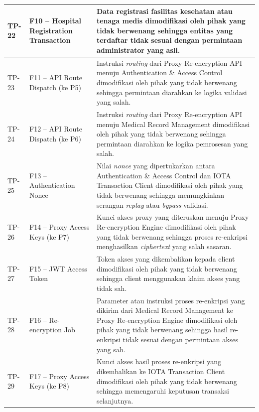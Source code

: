 \begin{xltabular}{\textwidth}{|>{\centering\arraybackslash}p{1.8cm}|>{\raggedright\arraybackslash}p{3.2cm}|X|}
    TP-22 &
    F10 -- Hospital Registration Transaction &
    Data registrasi fasilitas kesehatan atau tenaga medis dimodifikasi oleh pihak yang tidak berwenang sehingga entitas yang terdaftar tidak sesuai dengan permintaan administrator yang asli. \\
    \hline

    TP-23 &
    F11 -- API Route Dispatch (ke P5) &
    Instruksi \textit{routing} dari Proxy Re-encryption API menuju Authentication \& Access Control dimodifikasi oleh pihak yang tidak berwenang sehingga permintaan diarahkan ke logika validasi yang salah. \\
    \hline

    TP-24 &
    F12 -- API Route Dispatch (ke P6) &
    Instruksi \textit{routing} dari Proxy Re-encryption API menuju Medical Record Management dimodifikasi oleh pihak yang tidak berwenang sehingga permintaan diarahkan ke logika pemrosesan yang salah. \\
    \hline

    TP-25 &
    F13 -- Authentication Nonce &
    Nilai \textit{nonce} yang dipertukarkan antara Authentication \& Access Control dan IOTA Transaction Client dimodifikasi oleh pihak yang tidak berwenang sehingga memungkinkan serangan \textit{replay} atau \textit{bypass} validasi. \\
    \hline

    TP-26 &
    F14 -- Proxy Access Keys (ke P7) &
    Kunci akses proxy yang diteruskan menuju Proxy Re-encryption Engine dimodifikasi oleh pihak yang tidak berwenang sehingga proses re-enkripsi menghasilkan \textit{ciphertext} yang salah sasaran. \\
    \hline

    TP-27 &
    F15 -- JWT Access Token &
    Token akses yang dikembalikan kepada client dimodifikasi oleh pihak yang tidak berwenang sehingga client menggunakan klaim akses yang tidak sah. \\
    \hline

    TP-28 &
    F16 -- Re-encryption Job &
    Parameter atau instruksi proses re-enkripsi yang dikirim dari Medical Record Management ke Proxy Re-encryption Engine dimodifikasi oleh pihak yang tidak berwenang sehingga hasil re-enkripsi tidak sesuai dengan permintaan akses yang sah. \\
    \hline

    TP-29 &
    F17 -- Proxy Access Keys (ke P8) &
    Kunci akses hasil proses re-enkripsi yang dikembalikan ke IOTA Transaction Client dimodifikasi oleh pihak yang tidak berwenang sehingga memengaruhi keputusan transaksi selanjutnya. \\
    \hline


\end{xltabular}
